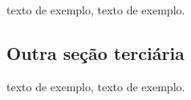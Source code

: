 \documentclass[
	12pt,				%
	oneside,			%
	a4paper,			%
	english,			%
	brazil				%
	]{abntex2ppgsi}
\begin{document}
 texto de exemplo, texto de exemplo.

\subsection{Outra seção terciária}

 texto de exemplo, texto de exemplo.


\postextual



%
%

\end{document}
